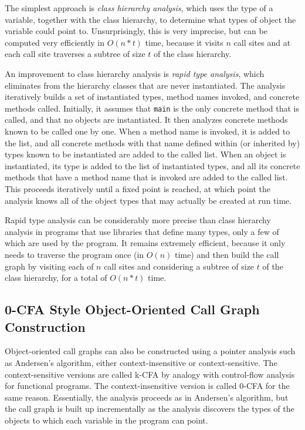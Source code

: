 \documentclass[11pt]{article}
\begin{document}
The simplest approach is \textit{class hierarchy analysis}, which uses the type of a variable, together with the class hierarchy, to determine what types of object the variable could point to.  Unsurprisingly, this is very imprecise, but can be computed very efficiently in $O(n*t)$ time, because it visits $n$ call sites and at each call site traverses a subtree of size $t$ of the class hierarchy.

An improvement to class hierarchy analysis is \textit{rapid type analysis}, which eliminates from the hierarchy classes that are never instantiated.  The analysis iteratively builds a set of instantiated types, method names invoked, and concrete methods called.  Initially, it assumes that \texttt{main} is the only concrete method that is called, and that no objects are instantiated.  It then analyzes concrete methods known to be called one by one.  When a method name is invoked, it is added to the list, and all concrete methods with that name defined within (or inherited by) types known to be instantiated are added to the called list.  When an object is instantiated, its type is added to the list of instantiated types, and all its concrete methods that have a method name that is invoked are added to the called list.  This proceeds iteratively until a fixed point is reached, at which point the analysis knows all of the object types that may actually be created at run time.

Rapid type analysis can be considerably more precise than class hierarchy analysis in programs that use libraries that define many types, only a few of which are used by the program.  It remains extremely efficient, because it only needs to traverse the program once (in $O(n)$ time) and then build the call graph by visiting each of $n$ call sites and considering a subtree of size $t$ of the class hierarchy, for a total of $O(n*t)$ time.

\subsection{0-CFA Style Object-Oriented Call Graph Construction}

Object-oriented call graphs can also be constructed using a pointer analysis such as Andersen's algorithm, either context-insensitive or context-sensitive.  The context-sensitive versions are called k-CFA by analogy with control-flow analysis for functional programs.  The context-insensitive version is called 0-CFA for the same reason.  Essentially, the analysis proceeds as in Andersen's algorithm, but the call graph is built up incrementally as the analysis discovers the types of the objects to which each variable in the program can point.
\end{document}
